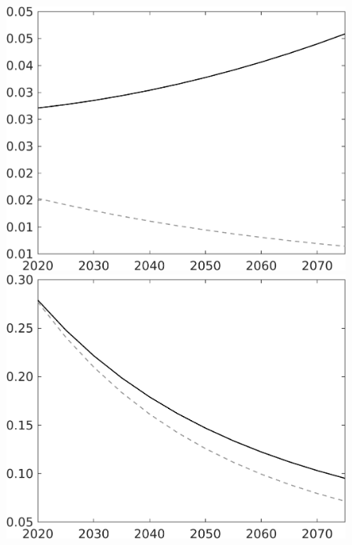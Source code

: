 \documentclass[12pt]{article}
\begin{document}
\begin{figure}[h!!]
\begin{minipage}[]{0.32\textwidth}
	\end{minipage}	
	\begin{minipage}[]{0.32\textwidth}
		\includegraphics[width=1\textwidth]{../../codding_model/own_basedOnFried/optimalPol_010922_revision/figures/all_13Sept22/LevTaufNoTauf_TaulCalib_regime0_G_spillover0_nsk0_xgr0_knspil1_sep1_LFlimit0_emsbase0_countec0_GovRev0_etaa0.79_lgd0.png}
	\end{minipage}		
	\begin{minipage}[]{0.32\textwidth}
		\includegraphics[width=1\textwidth]{../../codding_model/own_basedOnFried/optimalPol_010922_revision/figures/all_13Sept22/LevTaufNoTauf_TaulCalib_regime0_pf_spillover0_nsk0_xgr0_knspil1_sep1_LFlimit0_emsbase0_countec0_GovRev0_etaa0.79_lgd0.png}

\end{minipage}
\end{figure}
\end{document}
